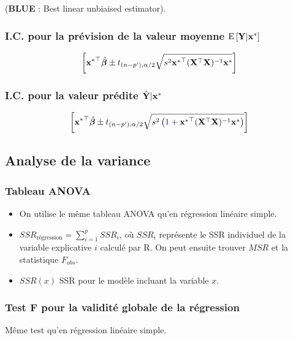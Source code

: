 \documentclass[10pt, french]{article}
\begin{document}
\begin{multicols*}{3}
(\textbf{BLUE} : Best linear unbiaised estimator).

\subsubsection*{I.C. pour la prévision de la valeur moyenne $\mathrm{E} \left[ \mathbf{Y} | \mathbf{x^*} \right]$}
\begin{align*}
\left[ \mathbf{{x^*}^\top} \hat{\bm{\beta}} \pm t_{(n-p'), \alpha/2} \sqrt{s^2 \mathbf{{x^*}^\top} (\mathbf{X}^\top \mathbf{X})^{-1}\mathbf{x^*}} \right]
\end{align*}

\subsubsection*{I.C. pour la valeur prédite $\hat{\mathbf{Y}}|\mathbf{x^*}$}
\begin{align*}
\left[ \mathbf{{x^*}^\top} \hat{\bm{\beta}} \pm t_{(n-p'), \alpha/2} \sqrt{s^2\left( {\color{blue}1} +  \mathbf{{x^*}^\top} (\mathbf{X}^\top \mathbf{X})^{-1}\mathbf{x^*}\right)} \right]
\end{align*}


\subsection*{Analyse de la variance}
\subsubsection*{Tableau ANOVA}
\begin{itemize}
\item On utilise le même tableau ANOVA qu'en régression linéaire simple.
\item $SSR_{\text{régression}} = \sum_{i=1}^{p} SSR_i $, où $SSR_i$ représente le SSR individuel de la variable explicative $i$ calculé par R. On peut ensuite trouver $MSR$ et la statistique $F_{obs}$.
\item $SSR(x)$ SSR pour le modèle incluant la variable $x$.
\end{itemize}

\subsubsection*{Test F pour la validité globale de la régression}
Même test qu'en régression linéaire simple.



\end{multicols*}
\end{document}
